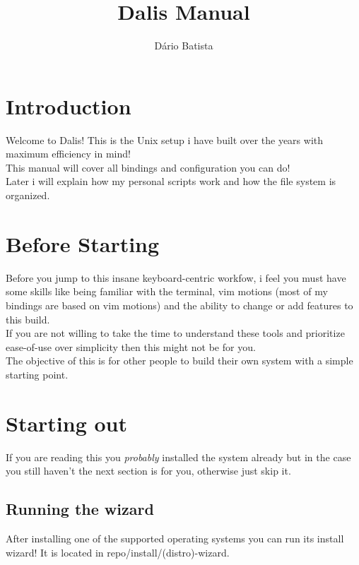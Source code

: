 \documentclass[12pt, a4paper]{article}
\author{Dário Batista}
\title{Dalis Manual}
\begin{document}
\maketitle
\thispagestyle{empty}

\newpage

\tableofcontents

\newpage

\section{Introduction}

Welcome to Dalis! This is the Unix setup i have built over the years with
maximum efficiency in mind!\\
This manual will cover all bindings and configuration you can do!\\
Later i will explain how my personal scripts work and how the file system is organized.

\section{Before Starting}

Before you jump to this insane keyboard-centric workfow, i feel you must have some skills
like being familiar with the terminal, vim motions (most of my bindings are based on vim motions)
and the ability to change or add features to this build.\\
If you are not willing to take the time to understand these tools and prioritize
ease-of-use over simplicity then this might not be for you.\\
The objective of this is for other people to build their own system with a simple
starting point.

\section{Starting out}

If you are reading this you \textit{probably} installed the system already but
in the case you still haven't the next section is for you, otherwise just skip it.

\subsection{Running the wizard}

After installing one of the supported operating systems you can run its install wizard!
It is located in repo/install/(distro)-wizard.\\
\end{document}

